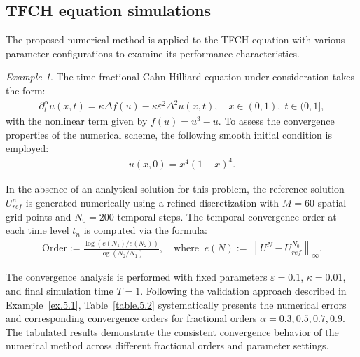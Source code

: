\documentclass{siamart171218}
\theoremstyle{remark}
\theoremstyle{example}
\newtheorem*{example}{Example}  %
\numberwithin{equation}{section}
\begin{document}
\subsection{TFCH equation simulations}

The proposed numerical method is applied to the TFCH equation with various parameter configurations to examine its performance characteristics.

\begin{example}\label{ex.5.2}
 The time-fractional Cahn-Hilliard equation under consideration takes the form:
\begin{align*}
    \partial^\alpha_t u(x,t) = \kappa \Delta f(u) - \kappa \varepsilon^2 \Delta^2 u(x,t), \quad x \in (0,1),\; t \in (0,1],
\end{align*}
with the nonlinear term given by $f(u) = u^3 - u$. To assess the convergence properties of the numerical scheme, the following smooth initial condition is employed:
\begin{align*}
    u(x,0) = x^4(1-x)^4.
\end{align*}
\end{example}

In the absence of an analytical solution for this problem, the reference solution $U^{n}_{ref}$ is generated numerically using a refined discretization with $M = 60$ spatial grid points and $N_0 = 200$ temporal steps. The temporal convergence order at each time level $t_n$ is computed via the formula:
\begin{align*}
\mathrm{Order} := \frac{\log(e(N_1)/e(N_2))}{\log(N_2/N_1)},\quad \text{where}\;\;
e(N) := \left\|U^N-U^{N_0}_{ref}\right\|_\infty.
\end{align*}

The convergence analysis is performed with fixed parameters $\varepsilon = 0.1$, $\kappa = 0.01$, and final simulation time $T = 1$. Following the validation approach described in Example~\ref{ex.5.1}, Table~\ref{table.5.2} systematically presents the numerical errors and corresponding convergence orders for fractional orders $\alpha=0.3, 0.5, 0.7, 0.9$. The tabulated results demonstrate the consistent convergence behavior of the numerical method across different fractional orders and parameter settings.
\end{document}
